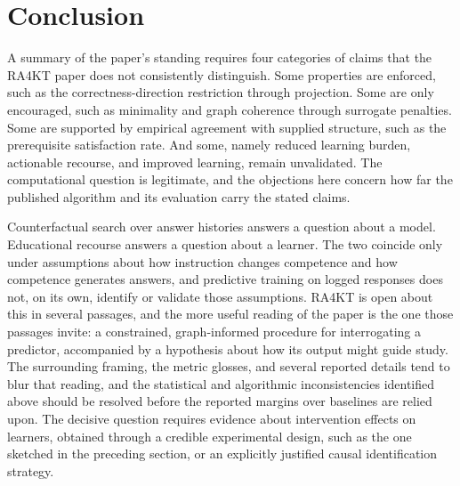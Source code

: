 \documentclass[11pt]{article}
\begin{document}
\section{Conclusion}

A summary of the paper's standing requires four categories of claims that the RA4KT paper does not consistently distinguish. Some properties are enforced, such as the correctness-direction restriction through projection. Some are only encouraged, such as minimality and graph coherence through surrogate penalties. Some are supported by empirical agreement with supplied structure, such as the prerequisite satisfaction rate. And some, namely reduced learning burden, actionable recourse, and improved learning, remain unvalidated. The computational question is legitimate, and the objections here concern how far the published algorithm and its evaluation carry the stated claims.

Counterfactual search over answer histories answers a question about a model. Educational recourse answers a question about a learner. The two coincide only under assumptions about how instruction changes competence and how competence generates answers, and predictive training on logged responses does not, on its own, identify or validate those assumptions. RA4KT is open about this in several passages, and the more useful reading of the paper is the one those passages invite: a constrained, graph-informed procedure for interrogating a predictor, accompanied by a hypothesis about how its output might guide study. The surrounding framing, the metric glosses, and several reported details tend to blur that reading, and the statistical and algorithmic inconsistencies identified above should be resolved before the reported margins over baselines are relied upon. The decisive question requires evidence about intervention effects on learners, obtained through a credible experimental design, such as the one sketched in the preceding section, or an explicitly justified causal identification strategy.
\end{document}
